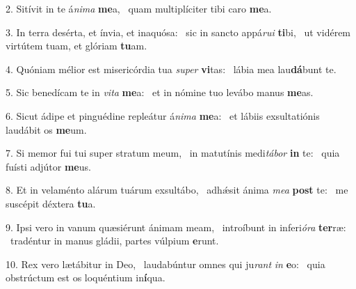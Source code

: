 2. Sitívit in te á\textit{ni}\textit{ma} \textbf{me}a, \ast\  quam multiplíciter tibi caro \textbf{me}a.\

3. In terra desérta, et ínvia, et inaquósa: \dag\  sic in sancto appá\textit{ru}\textit{i} \textbf{ti}bi, \ast\  ut vidérem virtútem tuam, et glóriam \textbf{tu}am.\

4. Quóniam mélior est misericórdia tua \textit{su}\textit{per} \textbf{vi}tas: \ast\  lábia mea lau\textbf{dá}bunt te.\

5. Sic benedícam te in \textit{vi}\textit{ta} \textbf{me}a: \ast\  et in nómine tuo levábo manus \textbf{me}as.\

6. Sicut ádipe et pinguédine repleátur á\textit{ni}\textit{ma} \textbf{me}a: \ast\  et lábiis exsultatiónis laudábit os \textbf{me}um.\

7. Si memor fui tui super stratum meum, \dag\  in matutínis medi\textit{tá}\textit{bor} \textbf{in} te: \ast\  quia fuísti adjútor \textbf{me}us.\

8. Et in velaménto alárum tuárum exsultábo, \dag\  adhǽsit ánima \textit{me}\textit{a} \textbf{post} te: \ast\  me suscépit déxtera \textbf{tu}a.\

9. Ipsi vero in vanum quæsiérunt ánimam meam, \dag\  introíbunt in inferi\textit{ó}\textit{ra} \textbf{ter}ræ: \ast\  tradéntur in manus gládii, partes vúlpium \textbf{e}runt.\

10. Rex vero lætábitur in Deo, \dag\  laudabúntur omnes qui ju\textit{rant} \textit{in} \textbf{e}o: \ast\  quia obstrúctum est os loquéntium in\textbf{í}qua.\


